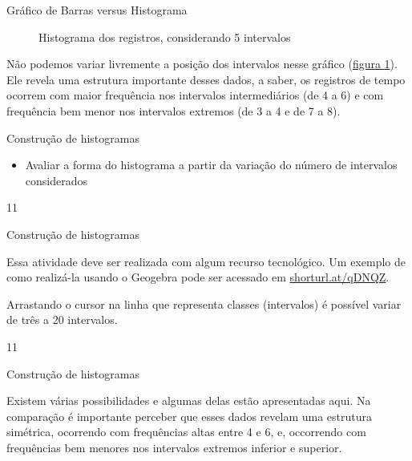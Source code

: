 {\begin{observation}{Gráfico de Barras versus Histograma}
\begin{figure}[H]
\caption{Histograma dos registros, considerando 5 intervalos}
\label{est1-fig-21}
\end{figure}

Não podemos variar livremente a posição dos intervalos nesse gráfico (\hyperref[est1-fig-21]{figura \ref{est1-fig-21}}). Ele revela uma estrutura importante desses dados, a saber, os registros de tempo ocorrem com maior frequência nos intervalos intermediários (de 4 a 6) e com frequência bem menor nos intervalos extremos (de 3 a 4 e de 7 a 8).
\end{observation}
\clearpage


\def\currentcolor{session2}
\begin{objectives}{Construção de histogramas}
{
\begin{itemize}
\item Avaliar a forma do histograma a partir da variação do número de intervalos considerados
\end{itemize}
}{1}{1}
\end{objectives}
\begin{sugestions}{Construção de histogramas}
{
Essa atividade deve ser realizada com algum recurso tecnológico. Um exemplo de como realizá-la usando o Geogebra pode ser acessado em \url{shorturl.at/qDNQZ}.

Arrastando o cursor na linha que representa classes (intervalos) é possível variar de três a 20 intervalos.
}{1}{1}
\end{sugestions}
\begin{answer}{Construção de histogramas}
{
Existem várias possibilidades e algumas delas estão apresentadas aqui. Na comparação é importante perceber que esses dados revelam uma estrutura simétrica, ocorrendo com frequências altas entre 4 e 6, e, occorrendo com frequências bem menores nos intervalos extremos inferior e superior.

\begin{figure}[H]
\centering

\begin{tikzpicture}[scale=.75*0.45]


\end{tikzpicture}
\end{figure}}
\end{answer}}
